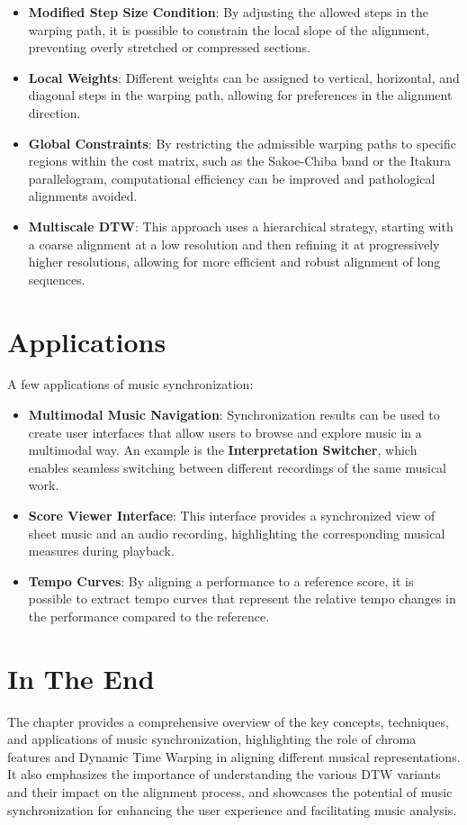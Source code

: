 \documentclass[a4paper, 9pt, twocolumn]{extarticle}
\begin{document}
\begin{itemize}
  \item
        \textbf{Modified Step Size Condition}: By adjusting the allowed steps
        in the warping path, it is possible to constrain the local slope of
        the alignment, preventing overly stretched or compressed sections.
  \item
        \textbf{Local Weights}: Different weights can be assigned to vertical,
        horizontal, and diagonal steps in the warping path, allowing for
        preferences in the alignment direction.
  \item
        \textbf{Global Constraints}: By restricting the admissible warping
        paths to specific regions within the cost matrix, such as the
        Sakoe-Chiba band or the Itakura parallelogram, computational
        efficiency can be improved and pathological alignments avoided.
  \item
        \textbf{Multiscale DTW}: This approach uses a hierarchical strategy,
        starting with a coarse alignment at a low resolution and then refining
        it at progressively higher resolutions, allowing for more efficient
        and robust alignment of long sequences.
\end{itemize}
\section{Applications}
A few applications of music synchronization:

\begin{itemize}
  \item
        \textbf{Multimodal Music Navigation}: Synchronization results can be
        used to create user interfaces that allow users to browse and explore
        music in a multimodal way. An example is the \textbf{Interpretation
          Switcher}, which enables seamless switching between different
        recordings of the same musical work.
  \item
        \textbf{Score Viewer Interface}: This interface provides a
        synchronized view of sheet music and an audio recording, highlighting
        the corresponding musical measures during playback.
  \item
        \textbf{Tempo Curves}: By aligning a performance to a reference score,
        it is possible to extract tempo curves that represent the relative
        tempo changes in the performance compared to the reference.
\end{itemize}
\section{In The End}
The chapter provides a comprehensive overview of the key
concepts, techniques, and applications of music synchronization,
highlighting the role of chroma features and Dynamic Time Warping in
aligning different musical representations. It also emphasizes the
importance of understanding the various DTW variants and their impact on
the alignment process, and showcases the potential of music
synchronization for enhancing the user experience and facilitating music
analysis.
\end{document}
